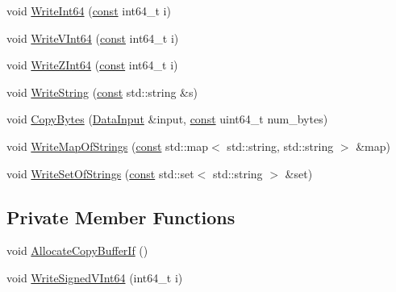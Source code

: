 \begin{DoxyCompactItemize}
\item 
void \mbox{\hyperlink{classlucene_1_1core_1_1store_1_1DataOutput_aa778fe689b0bd6d642b09fe5874df95e}{Write\+Int64}} (\mbox{\hyperlink{ZlibCrc32_8h_a2c212835823e3c54a8ab6d95c652660e}{const}} int64\+\_\+t i)
\item 
void \mbox{\hyperlink{classlucene_1_1core_1_1store_1_1DataOutput_a48e7669f558350c3071bbb4b44c2d0a3}{Write\+V\+Int64}} (\mbox{\hyperlink{ZlibCrc32_8h_a2c212835823e3c54a8ab6d95c652660e}{const}} int64\+\_\+t i)
\item 
void \mbox{\hyperlink{classlucene_1_1core_1_1store_1_1DataOutput_aad0abddbe300bdf599bf7464538891c1}{Write\+Z\+Int64}} (\mbox{\hyperlink{ZlibCrc32_8h_a2c212835823e3c54a8ab6d95c652660e}{const}} int64\+\_\+t i)
\item 
void \mbox{\hyperlink{classlucene_1_1core_1_1store_1_1DataOutput_abc55059fde4499b458c64f346e689be5}{Write\+String}} (\mbox{\hyperlink{ZlibCrc32_8h_a2c212835823e3c54a8ab6d95c652660e}{const}} std\+::string \&s)
\item 
void \mbox{\hyperlink{classlucene_1_1core_1_1store_1_1DataOutput_a7073c24bf5335a0910543bcc903b0bda}{Copy\+Bytes}} (\mbox{\hyperlink{classlucene_1_1core_1_1store_1_1DataInput}{Data\+Input}} \&input, \mbox{\hyperlink{ZlibCrc32_8h_a2c212835823e3c54a8ab6d95c652660e}{const}} uint64\+\_\+t num\+\_\+bytes)
\item 
void \mbox{\hyperlink{classlucene_1_1core_1_1store_1_1DataOutput_a82a073239273ecf9a2a88d6d7156330b}{Write\+Map\+Of\+Strings}} (\mbox{\hyperlink{ZlibCrc32_8h_a2c212835823e3c54a8ab6d95c652660e}{const}} std\+::map$<$ std\+::string, std\+::string $>$ \&map)
\item 
void \mbox{\hyperlink{classlucene_1_1core_1_1store_1_1DataOutput_af22effd34a9fa2b51d166c8ccc03ea03}{Write\+Set\+Of\+Strings}} (\mbox{\hyperlink{ZlibCrc32_8h_a2c212835823e3c54a8ab6d95c652660e}{const}} std\+::set$<$ std\+::string $>$ \&set)
\end{DoxyCompactItemize}
\subsection*{Private Member Functions}
\begin{DoxyCompactItemize}
\item 
void \mbox{\hyperlink{classlucene_1_1core_1_1store_1_1DataOutput_a10cb01ee76cad9e6250ef39571fd5bbc}{Allocate\+Copy\+Buffer\+If}} ()
\item 
void \mbox{\hyperlink{classlucene_1_1core_1_1store_1_1DataOutput_abf3dcbf20c57bc8a52ec45f08ef65264}{Write\+Signed\+V\+Int64}} (int64\+\_\+t i)
\end{DoxyCompactItemize}
